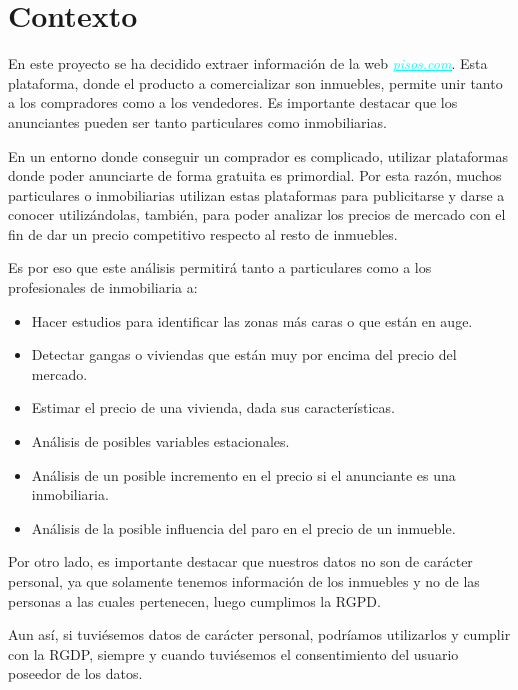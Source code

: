 \documentclass[a4paper, 12pt]{article}
\begin{document}
\newpage
\mbox{}
\thispagestyle{empty} %
\clearpage


\tableofcontents
\clearpage %

\section{Contexto}

En este proyecto se ha decidido extraer información de la web \href{https://www.pisos.com} {\textcolor{cyan}{\underline{{\itshape pisos.com}}}}. Esta plataforma, donde el producto a comercializar son inmuebles, permite unir tanto a los compradores como a los vendedores. Es importante destacar que los anunciantes pueden ser tanto particulares como inmobiliarias. 

En un entorno donde conseguir un comprador es complicado, utilizar plataformas donde poder anunciarte de forma gratuita es primordial. Por esta razón, muchos particulares o inmobiliarias utilizan estas plataformas para publicitarse y darse a conocer utilizándolas, también, para poder analizar los precios de mercado con el fin de dar un precio competitivo respecto al resto de inmuebles. 

Es por eso que este análisis permitirá tanto a particulares como a los profesionales de inmobiliaria a:
\begin{itemize}
	\item Hacer estudios para identificar las zonas más caras o que están en auge.
	\item Detectar gangas o viviendas que están muy por encima del precio del mercado.
	\item Estimar el precio de una vivienda, dada sus características.
	\item Análisis de posibles variables estacionales.
	\item Análisis de un posible incremento en el precio si el anunciante es una inmobiliaria.
	\item Análisis de la posible influencia del paro en el precio de un inmueble.
\end{itemize}


Por otro lado, es importante destacar que nuestros datos no son de carácter personal, ya que solamente tenemos información de los inmuebles y no de las personas a las cuales pertenecen, luego cumplimos la RGPD. 

Aun así, si tuviésemos datos de carácter personal, podríamos utilizarlos y cumplir con la RGDP, siempre y cuando tuviésemos el consentimiento del usuario poseedor de los datos.
\end{document}
